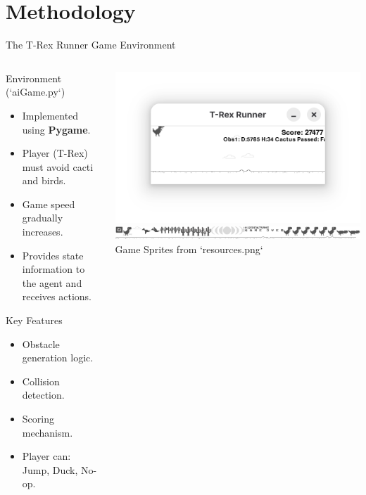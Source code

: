 \documentclass{beamer}
\begin{document}
\section{Methodology}

\begin{frame}{The T-Rex Runner Game Environment}
  \begin{columns}[T]
    \begin{column}{0.5\textwidth}
      \begin{block}{Environment (`aiGame.py`)}
        \begin{itemize}
            \item Implemented using \textbf{Pygame}.
            \item Player (T-Rex) must avoid cacti and birds.
            \item Game speed gradually increases.
            \item Provides state information to the agent and receives actions.
        \end{itemize}
      \end{block}
      \begin{block}{Key Features}
          \begin{itemize}
              \item Obstacle generation logic.
              \item Collision detection.
              \item Scoring mechanism.
              \item Player can: Jump, Duck, No-op.
          \end{itemize}
      \end{block}
    \end{column}
    \begin{column}{0.5\textwidth}
      \centering
      \includegraphics[width=\linewidth]{media/trex_game.png} \\
      \includegraphics[width=0.9\linewidth]{media/resources.png} \\ %
      \tiny Game Sprites from `resources.png`
    \end{column}
  \end{columns}
\end{frame}
\end{document}
